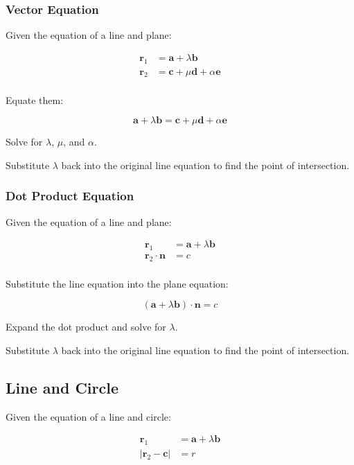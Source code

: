 \documentclass[a4paper,11pt]{article}
\newcommand{\bb}{\boldsymbol}
\begin{document}
\subsubsection{Vector Equation}

Given the equation of a line and plane:

$$
\begin{aligned}
\bb{r}_1 & = \bb{a} + \lambda \bb{b} \\
\bb{r}_2 & = \bb{c} + \mu \bb{d} + \alpha \bb{e} \\
\end{aligned}
$$

Equate them:

$$
\bb{a} + \lambda \bb{b}  = \bb{c} + \mu \bb{d} + \alpha \bb{e}
$$

Solve for $\lambda$, $\mu$, and $\alpha$.

Substitute $\lambda$ back into the original line equation to find the point of
intersection.


\subsubsection{Dot Product Equation}

Given the equation of a line and plane:

$$
\begin{aligned}
\bb{r}_1 & = \bb{a} + \lambda \bb{b} \\
\bb{r}_2 \cdot \bb{n} & = c \\
\end{aligned}
$$

Substitute the line equation into the plane equation:

$$
(\bb{a} + \lambda \bb{b}) \cdot \bb{n} = c
$$

Expand the dot product and solve for $\lambda$.

Substitute $\lambda$ back into the original line equation to find the point of
intersection.


\subsection{Line and Circle}

Given the equation of a line and circle:

$$
\begin{aligned}
\bb{r}_1 & = \bb{a} + \lambda \bb{b} \\
\lvert \bb{r}_2 - \bb{c} \rvert & = r \\
\end{aligned}
$$
\end{document}
